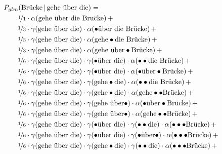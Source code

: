 \documentclass[11pt,a4paper]{article}
\newcommand\givenbase[1][]{\,#1\lvert\,}
\let\given\givenbase
\newcommand{\probSymbol}[1][]{P_{#1}}
\newcommand{\prob}[2][]{\probSymbol[#1](#2)}
\newcommand{\probCond}[3][]{\prob[#1]{#2 \given #3}}
\begin{document}
\begin{equation}
  \begin{split}
    &\hspace{-2em}\probCond[glm]{\text{Br\"ucke}}{\text{gehe \"uber die}} = \\
    &\nicefrac{1}{1} \cdot \alpha(\text{gehe \"uber die Bru\"cke}) \, + \\
    &\nicefrac{1}{3} \cdot \gamma(\text{gehe \"uber die}) \cdot \alpha(\bullet\text{\"uber die Br\"ucke}) \, + \\
    &\nicefrac{1}{3} \cdot \gamma(\text{gehe \"uber die}) \cdot \alpha(\text{gehe}\bullet\text{die Br\"ucke}) \, + \\
    &\nicefrac{1}{3} \cdot \gamma(\text{gehe \"uber die}) \cdot \alpha(\text{gehe \"uber}\bullet\text{Br\"ucke}) \, + \\
    &\nicefrac{1}{6} \cdot \gamma(\text{gehe \"uber die}) \cdot \gamma(\bullet\text{\"uber die}) \cdot \alpha(\bullet\bullet\text{die Br\"ucke}) \, + \\
    &\nicefrac{1}{6} \cdot \gamma(\text{gehe \"uber die}) \cdot \gamma(\bullet\text{\"uber die}) \cdot \alpha(\bullet\text{\"uber}\bullet\text{Br\"ucke}) \, + \\
    &\nicefrac{1}{6} \cdot \gamma(\text{gehe \"uber die}) \cdot \gamma(\text{gehe}\bullet\text{die}) \cdot \alpha(\bullet\bullet\text{die Br\"ucke}) \, + \\
    &\nicefrac{1}{6} \cdot \gamma(\text{gehe \"uber die}) \cdot \gamma(\text{gehe}\bullet\text{die}) \cdot \alpha(\text{gehe}\bullet\bullet\text{Br\"ucke}) \, + \\
    &\nicefrac{1}{6} \cdot \gamma(\text{gehe \"uber die}) \cdot \gamma(\text{gehe \"uber}\bullet) \cdot \alpha(\bullet\text{\"uber}\bullet\text{Br\"ucke}) \, + \\
    &\nicefrac{1}{6} \cdot \gamma(\text{gehe \"uber die}) \cdot \gamma(\text{gehe \"uber}\bullet) \cdot \alpha(\text{gehe}\bullet\bullet\text{Br\"ucke}) \, + \\
    &\nicefrac{1}{6} \cdot \gamma(\text{gehe \"uber die}) \cdot \gamma(\bullet\text{\"uber die}) \cdot \gamma(\bullet\bullet\text{die}) \cdot \alpha(\bullet\bullet\bullet\text{Br\"ucke}) \, + \\
    &\nicefrac{1}{6} \cdot \gamma(\text{gehe \"uber die}) \cdot \gamma(\bullet\text{\"uber die}) \cdot \gamma(\bullet\text{\"uber}\bullet) \cdot \alpha(\bullet\bullet\bullet\text{Br\"ucke}) \, + \\
    &\nicefrac{1}{6} \cdot \gamma(\text{gehe \"uber die}) \cdot \gamma(\text{gehe}\bullet\text{die}) \cdot \gamma(\bullet\bullet\text{die}) \cdot \alpha(\bullet\bullet\bullet\text{Br\"ucke}) \, + \\

\end{split}
\end{equation}
\end{document}
